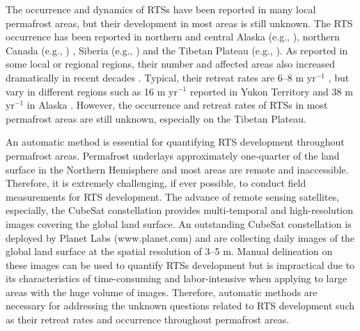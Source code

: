 \documentclass[authoryear,preprint,review,12pt]{elsarticle}
\begin{document}
The occurrence and dynamics of RTSs have been reported in many local permafrost areas, but their development in most areas is still unknown. 
The RTS occurrence has been reported in northern and central Alaska (e.g., \citealp{swanson2018growth,balser2014timing}), northern Canada (e.g., \citealp{burn1990canadian, cassidy2017impacts, armstrong2018thaw,lewkowicz2019extremes}) , Siberia (e.g., \citealp{leibman2003dynamics, zwieback2018sub}) and the Tibetan Plateau (e.g., \citealp{niu2005engineering, niu2016thaw}). 
As reported in some local or regional regions, their number and affected areas also increased dramatically in recent decades \citep{luo2019recent, lewkowicz2019extremes}.
Typical, their retreat rates are 6--8 m yr$^{-1}$ \citep{jorgenson_thermokarst_2013}, but vary in different regions such as 16 m yr$^{-1}$ reported in Yukon Territory \citep{burn1989geomorphology} and 38 m yr$^{-1}$  in Alaska \citep{swanson2018growth}.
However, the occurrence and retreat rates of RTSs in most permafrost areas are still unknown, especially on the Tibetan Plateau. 

An automatic method is essential for quantifying RTS development throughout permafrost areas. 
Permafrost underlays approximately one-quarter of the land surface in the Northern Hemisphere \citep{zhang1999statistics} and most areas are remote and inaccessible. 
Therefore, it is extremely challenging, if ever possible, to conduct field measurements for RTS development. 
The advance of remote sensing satellites, especially, the CubeSat constellation provides multi-temporal and high-resolution images covering the global land surface. 
An outstanding CubeSat constellation is deployed by Planet Labs (www.planet.com) and are collecting daily images of the global land surface at the spatial resolution of 3--5 m.
Manual delineation on these images can be used to quantify RTSs development but is impractical due to its characteristics of time-consuming and labor-intensive when applying to large areas with the huge volume of images. 
Therefore, automatic methods are necessary for addressing the unknown questions related to RTS development such as their retreat rates and occurrence throughout permafrost areas. 
\end{document}
